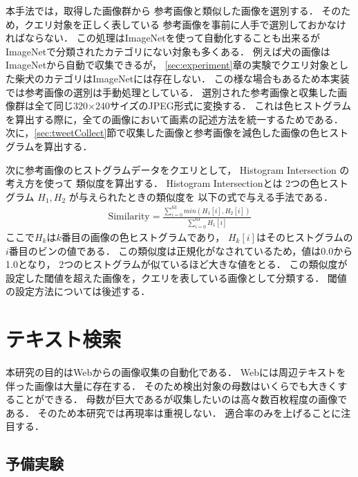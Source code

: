 本手法では，取得した画像群から
参考画像と類似した画像を選別する．
そのため，クエリ対象を正しく表している
参考画像を事前に人手で選別しておかなければならない．
この処理はImageNetを使って自動化することも出来るが
ImageNetで分類されたカテゴリにない対象も多くある．
例えば犬の画像はImageNetから自動で収集できるが，
\ref{sec:experiment}章の実験でクエリ対象とした柴犬のカテゴリはImageNetには存在しない．
この様な場合もあるため本実装では参考画像の選別は手動処理としている．
%
選別された参考画像と収集した画像群は全て同じ320$\times$240サイズのJPEG形式に変換する．
これは色ヒストグラムを算出する際に，全ての画像において画素の記述方法を統一するためである．
次に，\ref{sec:tweetCollect}節で収集した画像と参考画像を減色した画像の色ヒストグラムを算出する．

次に参考画像のヒストグラムデータをクエリとして，
Histogram Intersection
の考え方を使って
類似度を算出する．
Histogram Intersectionとは
2つの色ヒストグラム
$H_1,H_2$
が与えられたときの類似度を
以下の式で与える手法である．
%
\begin{eqnarray}
\mbox{Similarity} = \frac{\sum_{i=0}^{63} min(H_1[i],H_2[i])}{\sum_{i=0}^{63} H_1[i]}
\end{eqnarray}
%
ここで$H_k$は$k$番目の画像の色ヒストグラムであり，
$H_k[i]$はそのヒストグラムの$i$番目のビンの値である．
この類似度は正規化がなされているため，値は0.0から1.0となり，
2つのヒストグラムが似ているほど大きな値をとる．
この類似度が設定した閾値を超えた画像を，クエリを表している画像として分類する．
閾値の設定方法については後述する．


\section{テキスト検索}

\label{sec:textSearch}

本研究の目的はWebからの画像収集の自動化である．
Webには周辺テキストを伴った画像は大量に存在する．
そのため検出対象の母数はいくらでも大きくすることができる．
母数が巨大であるが収集したいのは高々数百枚程度の画像である．
そのため本研究では再現率は重視しない．
適合率のみを上げることに注目する．

\subsection{予備実験}
\label{sec:yobijikken}

